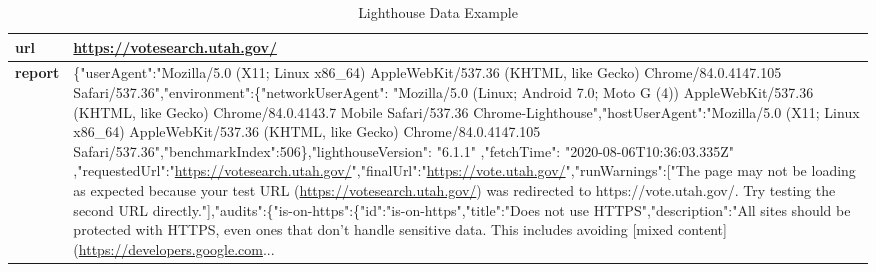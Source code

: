 \begin{enumerate}
	
	\begin{table}[H]
		\centering
		\begin{tabular*}{\textwidth}{|l|p{14.4cm}|}
			\hline
			\textbf{url} & \url{https://votesearch.utah.gov/}\\ 
			\hline
			\textbf{report} & \{"userAgent":"Mozilla/5.0 (X11; Linux x86\_64) AppleWebKit/537.36 (KHTML, like Gecko) Chrome/84.0.4147.105 Safari/537.36","environment":\{"networkUserAgent": "Mozilla/5.0 (Linux; Android 7.0; Moto G (4)) AppleWebKit/537.36 (KHTML, like Gecko) Chrome/84.0.4143.7 Mobile Safari/537.36 Chrome-Lighthouse","hostUserAgent":"Mozilla/5.0 (X11; Linux x86\_64) AppleWebKit/537.36 (KHTML, like Gecko) Chrome/84.0.4147.105 Safari/537.36","benchmarkIndex":506\},"lighthouseVersion": "6.1.1" ,"fetchTime": "2020-08-06T10:36:03.335Z" ,"requestedUrl":"\url{https://votesearch.utah.gov/}","finalUrl":"\url{https://vote.utah.gov/}","runWarnings":["The page may not be loading as expected because your test URL (\url{https://votesearch.utah.gov/}) was redirected to https://vote.utah.gov/. Try testing the second URL directly."],"audits":\{"is-on-https":\{"id":"is-on-https","title":"Does not use HTTPS","description":"All sites should be protected with HTTPS, even ones that don't handle sensitive data. This includes avoiding [mixed content](\url{https://developers.google.com}...\\
			\hline
			
		\end{tabular*}
		\caption{Lighthouse Data Example}
		\label{table:ct_lh_mobile}
	\end{table}
	
	

\end{enumerate}
